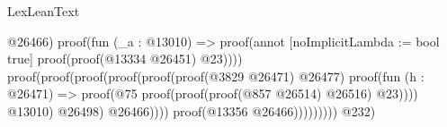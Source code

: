 \begin{lexlean}{LexLeanText}
\begin{coremodule}
                                                                                                            @26466)
                                                                                                          proof(fun (_a : @13010) =>
                                                                                                            proof(annot [noImplicitLambda := bool true]
                                                                                                              proof(proof(@13334
                                                                                                                    @26451)
                                                                                                                  @23))))
                                                                                                        proof(proof(proof(proof(proof(proof(@3829
                                                                                                                      @26471)
                                                                                                                    @26477)
                                                                                                                  proof(fun (h : @26471) =>
                                                                                                                    proof(@75
                                                                                                                        proof(proof(proof(@857
                                                                                                                                @26514)
                                                                                                                              @26516)
                                                                                                                            @23))))
                                                                                                                @13010)
                                                                                                              @26498)
                                                                                                            @26466))))
                                                                                              proof(@13356
                                                                                                  @26466)))))))))
                                                                      @232)

\end{coremodule}
\end{lexlean}
